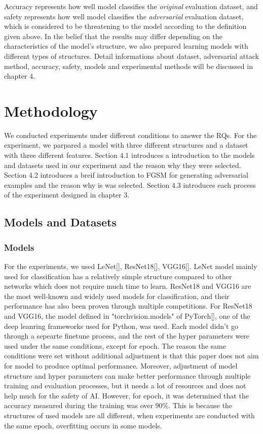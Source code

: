 \documentclass[journal,article,submit,moreauthors,pdftex]{Definitions/mdpi}
\begin{document}
Accuracy represents how well model classifies the {\it original} evaluation dataset, and safety represents how well model classifies the {\it adversarial} evaluation dataset, which is considered to be threatening to the model according to the definition given above.
In the belief that the results may differ depending on the characteristics of the model's structure, we also prepared learning models with different types of structures. 
Detail informations about dataset, adversarial attack method, accuracy, safety, models and experimental methods will be discussed in chapter 4.

\section{Methodology}

We conducted experiments under different conditions to answer the RQs. For the experiment, we parpared a model with three different structures and a dataset with three different features.
Section 4.1 introduces a introduction to the models and datasets used in our experiment and the reason why they were selected.
Section 4.2 introduces a breif introduction to FGSM for generating adversarial examples and the reason why is was selected.
Section 4.3 introduces each process of the experiment designed in chapter 3.

\subsection{Models and Datasets}
\subsubsection{Models}

For the experiments, we used LeNet[], ResNet18[], VGG16[].
LeNet model mainly used for classification has a relatively simple structure compared to other networks which does not require much time to learn.
ResNet18 and VGG16 are the most well-known and widely used models for classification, and their performance has also been proven through multiple competitions.
For ResNet18 and VGG16, the model defined in "torchvision.models" of PyTorch[], one of the deep leanring frameworks used for Python, was used.
Each model didn't go through a sepearte finetune process, and the rest of the hyper parameters were used under the same conditions, except for epoch.
The reason the same conditions were set without additional adjustment is that this paper does not aim for model to produce optimal performance.
Moreover, adjustment of model structure and hyper parameters can make better performance through multiple training and evaluation processes, but it needs a lot of resources and does not help much for the safety of AI.
However, for epoch, it was determined that the accuracy measured during the training was over 90\%. This is because the structures of used models are all different, when experiments are conducted with the same epoch, overfitting occurs in some models.
\end{document}
